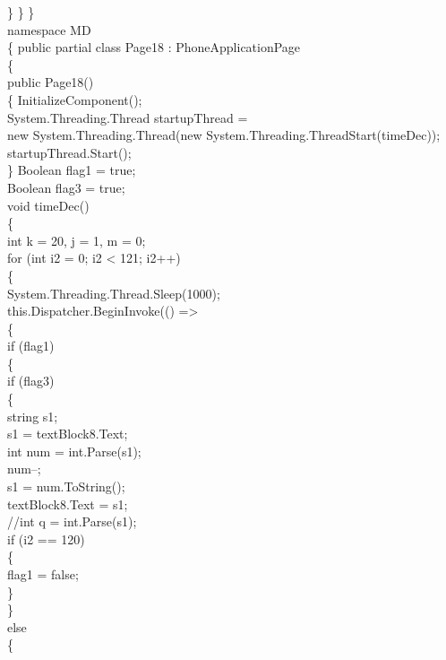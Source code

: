 {{        \}
    \}
\}\\


namespace MD\\
\{
    public partial class Page18 : PhoneApplicationPage\\
    \{\\
        public Page18()\\
        \{
            InitializeComponent();\\
            System.Threading.Thread startupThread =\\
                            new System.Threading.Thread(new System.Threading.ThreadStart(timeDec));\\
            startupThread.Start();\\
        \}
        Boolean flag1 = true;\\
        Boolean flag3 = true;\\
        void timeDec()\\
        \{\\
            int k = 20, j = 1, m = 0;\\

            for (int i2 = 0; i2 < 121; i2++)\\
            \{\\
                System.Threading.Thread.Sleep(1000);\\
                this.Dispatcher.BeginInvoke(() =>\\
                \{\\


                    if (flag1)\\
                    \{\\
                        if (flag3)\\
                        \{\\
                            string s1;\\
                            s1 = textBlock8.Text;\\
                            int num = int.Parse(s1);\\
                            num--;\\
                            s1 = num.ToString();\\
                            textBlock8.Text = s1;\\
                            //int q = int.Parse(s1);\\
                            if (i2 == 120)\\
                            \{\\
                                flag1 = false;\\
                            \}\\
                        \}\\
                        else\\
                        \{\\

}}

